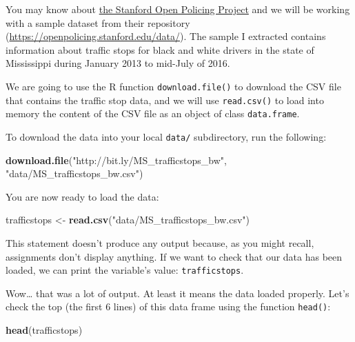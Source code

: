 \documentclass[]{book}
\newenvironment{Shaded}{\begin{snugshade}}{\end{snugshade}}
\newcommand{\KeywordTok}[1]{\textcolor[rgb]{0.13,0.29,0.53}{\textbf{#1}}}
\newcommand{\StringTok}[1]{\textcolor[rgb]{0.31,0.60,0.02}{#1}}
\newcommand{\NormalTok}[1]{#1}
\begin{document}
You may know about \href{https://openpolicing.stanford.edu}{the Stanford
Open Policing Project} and we will be working with a sample dataset from
their repository (\url{https://openpolicing.stanford.edu/data/}). The
sample I extracted contains information about traffic stops for black
and white drivers in the state of Mississippi during January 2013 to
mid-July of 2016.

We are going to use the R function \texttt{download.file()} to download
the CSV file that contains the traffic stop data, and we will use
\texttt{read.csv()} to load into memory the content of the CSV file as
an object of class \texttt{data.frame}.

To download the data into your local \texttt{data/} subdirectory, run
the following:

\begin{Shaded}
\begin{Highlighting}[]
\KeywordTok{download.file}\NormalTok{(}\StringTok{"http://bit.ly/MS_trafficstops_bw"}\NormalTok{, }\StringTok{"data/MS_trafficstops_bw.csv"}\NormalTok{)}
\end{Highlighting}
\end{Shaded}

You are now ready to load the data:

\begin{Shaded}
\begin{Highlighting}[]
\NormalTok{trafficstops <-}\StringTok{ }\KeywordTok{read.csv}\NormalTok{(}\StringTok{"data/MS_trafficstops_bw.csv"}\NormalTok{)}
\end{Highlighting}
\end{Shaded}

This statement doesn't produce any output because, as you might recall,
assignments don't display anything. If we want to check that our data
has been loaded, we can print the variable's value:
\texttt{trafficstops}.

Wow\ldots{} that was a lot of output. At least it means the data loaded
properly. Let's check the top (the first 6 lines) of this data frame
using the function \texttt{head()}:

\begin{Shaded}
\begin{Highlighting}[]
\KeywordTok{head}\NormalTok{(trafficstops)}
\end{Highlighting}
\end{Shaded}
\end{document}
